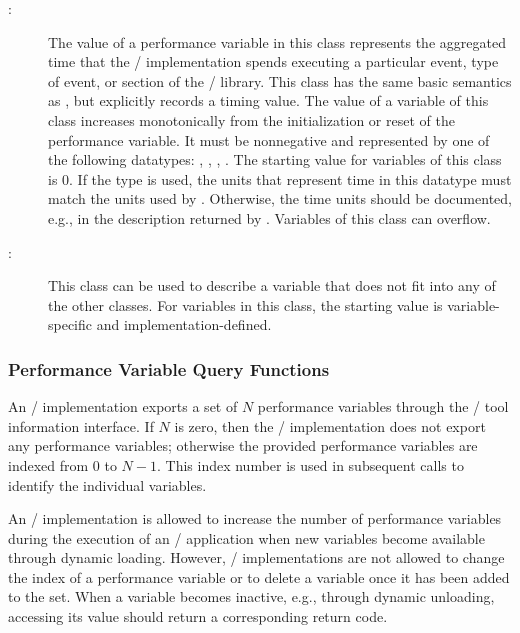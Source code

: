 \begin{sloppy}
\begin{description}
\item[:]The value of a performance
  variable in this class represents the aggregated time that the \MPI/
  implementation spends executing a particular event, type of event, or
  section of the \MPI/ library.  This class has the same basic semantics as
  , but explicitly records a timing
  value.  The value of a variable of this class increases monotonically
  from the initialization or reset of the performance variable.  It must be
  nonnegative and represented by one of the following datatypes:
  , ,
  , .  The starting
  value for variables of this class is 0.  If the type 
  is used, the units that represent time in this datatype must match the
  units used by .  Otherwise, the time units should be
  documented, e.g., in the description returned by
  .  Variables of this class can overflow.

\item[:]This class can be used to
  describe a variable that does not fit into any of the other classes.  For
  variables in this class, the starting value is variable-specific and
  implementation-defined.

\end{description}

\end{sloppy}

\subsubsection{Performance Variable Query Functions}

An \MPI/ implementation exports a set of $N$ performance variables through
the \MPI/ tool information interface.  If $N$ is zero, then the \MPI/
implementation does not export any performance variables; otherwise the
provided performance variables are indexed from $0$ to $N-1$.  This index
number is used in subsequent calls to identify the individual variables.

An \MPI/ implementation is allowed to increase the number of performance
variables during the execution of an \MPI/ application when new variables
become available through dynamic loading.  However, \MPI/ implementations
are not allowed to change the index of a performance variable or to delete
a variable once it has been added to the set.  When a variable becomes
inactive, e.g., through dynamic unloading, accessing its value should
return a corresponding return code.

